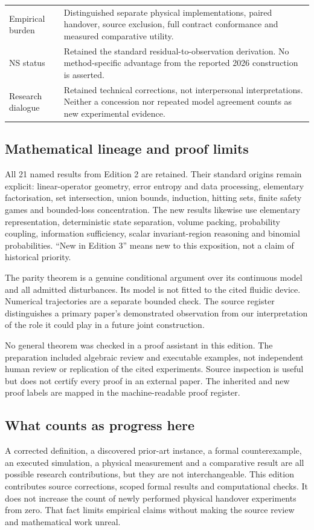 \begin{longtable}{@{}>{\raggedright\arraybackslash}p{}>{\raggedright\arraybackslash}p{}@{}}
Empirical burden & Distinguished separate physical implementations, paired handover, source exclusion, full contract conformance and measured comparative utility.\\
NS status & Retained the standard residual-to-observation derivation. No method-specific advantage from the reported 2026 construction is asserted.\\
Research dialogue & Retained technical corrections, not interpersonal interpretations. Neither a concession nor repeated model agreement counts as new experimental evidence.\\\bottomrule
\end{longtable}

\subsection{Mathematical lineage and proof limits}
All 21 named results from Edition 2 are retained. Their standard origins remain explicit: linear-operator geometry, error entropy and data processing, elementary factorisation, set intersection, union bounds, induction, hitting sets, finite safety games and bounded-loss concentration. The new results likewise use elementary representation, deterministic state separation, volume packing, probability coupling, information sufficiency, scalar invariant-region reasoning and binomial probabilities. ``New in Edition 3'' means new to this exposition, not a claim of historical priority.

The parity theorem is a genuine conditional argument over its continuous model and all admitted disturbances. Its model is not fitted to the cited fluidic device. Numerical trajectories are a separate bounded check. The source register distinguishes a primary paper's demonstrated observation from our interpretation of the role it could play in a future joint construction.

No general theorem was checked in a proof assistant in this edition. The preparation included algebraic review and executable examples, not independent human review or replication of the cited experiments. Source inspection is useful but does not certify every proof in an external paper. The inherited and new proof labels are mapped in the machine-readable proof register.

\subsection{What counts as progress here}
A corrected definition, a discovered prior-art instance, a formal counterexample, an executed simulation, a physical measurement and a comparative result are all possible research contributions, but they are not interchangeable. This edition contributes source corrections, scoped formal results and computational checks. It does not increase the count of newly performed physical handover experiments from zero. That fact limits empirical claims without making the source review and mathematical work unreal.

